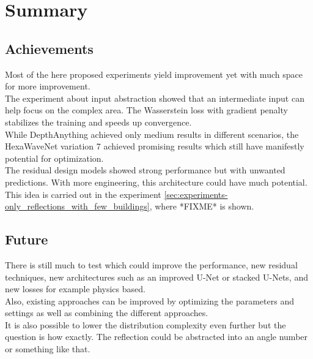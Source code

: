 \chapter{Summary}
\label{cha:summary}

	
	
	\section{Achievements}
	\label{sec:sum-reached}
	Most of the here proposed experiments yield improvement yet with much space for more improvement.\\
	The experiment about input abstraction showed that an intermediate input can help focus on the complex area. The Wasserstein loss with gradient penalty stabilizes the training and speeds up convergence.\\
	While DepthAnything achieved only medium results in different scenarios, the HexaWaveNet variation 7 achieved promising results which still have manifestly potential for optimization.\\
	The residual design models showed strong performance but with unwanted predictions. With more engineering, this architecture could have much potential.\\
	This idea is carried out in the experiment \ref{sec:experiments-only_reflections_with_few_buildings}, where *FIXME* is shown.
	
	\section{Future}
	\label{sec:sum-future}
	There is still much to test which could improve the performance, new residual techniques, new architectures such as an improved U-Net or stacked U-Nets, and new losses for example physics based.\\
	Also, existing approaches can be improved by optimizing the parameters and settings as well as combining the different approaches. \\
	It is also possible to lower the distribution complexity even further but the question is how exactly. The reflection could be abstracted into an angle number or something like that.
	
	
	